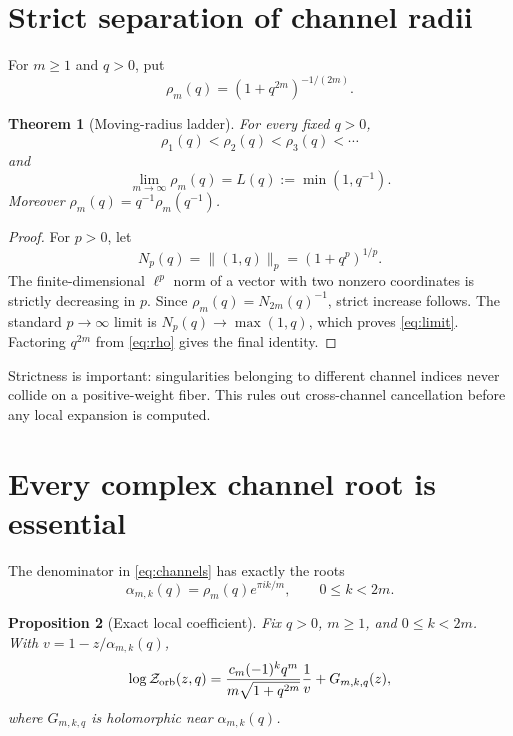 \documentclass[11pt]{article}
\newtheorem{theorem}{Theorem}[section]
\newtheorem{proposition}[theorem]{Proposition}
\newcommand{\Zorb}{\mathcal Z_{\rm orb}}
\begin{document}
\section{Strict separation of channel radii}

For $m\ge1$ and $q>0$, put
\begin{equation}\label{eq:rho}
 \rho_m(q)=(1+q^{2m})^{-1/(2m)}.
\end{equation}

\begin{theorem}[Moving-radius ladder]\label{thm:radii}
For every fixed $q>0$,
\[
 \rho_1(q)<\rho_2(q)<\rho_3(q)<\cdots
\]
and
\begin{equation}\label{eq:limit}
 \lim_{m\to\infty}\rho_m(q)
 =L(q):=\min(1,q^{-1}).
\end{equation}
Moreover
\(\rho_m(q)=q^{-1}\rho_m(q^{-1})\).
\end{theorem}

\begin{proof}
For $p>0$, let
\[
 N_p(q)=\|(1,q)\|_p=(1+q^p)^{1/p}.
\]
The finite-dimensional $\ell^p$ norm of a vector with two nonzero
coordinates is strictly decreasing in $p$.  Since
\(\rho_m(q)=N_{2m}(q)^{-1}\), strict increase follows.  The standard
$p\to\infty$ limit is \(N_p(q)\to\max(1,q)\), which proves
\eqref{eq:limit}.  Factoring $q^{2m}$ from \eqref{eq:rho} gives the final
identity.
\end{proof}

Strictness is important: singularities belonging to different channel
indices never collide on a positive-weight fiber.  This rules out
cross-channel cancellation before any local expansion is computed.

\section{Every complex channel root is essential}

The denominator in \eqref{eq:channels} has exactly the roots
\begin{equation}\label{eq:roots}
 \alpha_{m,k}(q)=\rho_m(q)e^{\pi i k/m},
 \qquad 0\le k<2m.
\end{equation}

\begin{proposition}[Exact local coefficient]\label{prop:local}
Fix $q>0$, $m\ge1$, and $0\le k<2m$.  With
\(v=1-z/\alpha_{m,k}(q)\),
\begin{equation}\label{eq:principal}
 \log\Zorb(z,q)=
 \frac{c_m(-1)^kq^m}{m\sqrt{1+q^{2m}}}
 \frac1v+G_{m,k,q}(z),
\end{equation}
where $G_{m,k,q}$ is holomorphic near $\alpha_{m,k}(q)$.
\end{proposition}
\end{document}

